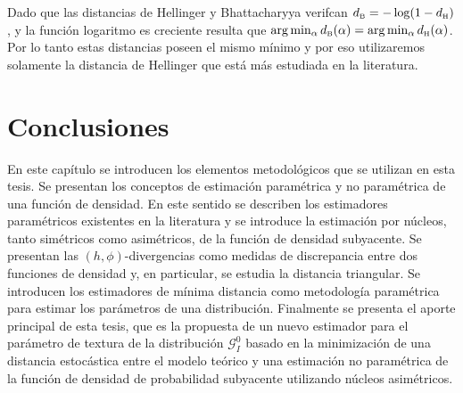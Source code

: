 Dado que las distancias de Hellinger y Bhattacharyya verifcan $d_\text{\tiny B}=-\log(1-d_\text{\tiny H})$, y la función logaritmo es creciente resulta que $\arg\min_\alpha d_\text{\tiny B}(\alpha )=\arg\min_ \alpha d_\text{\tiny H}(\alpha )$. Por lo tanto estas distancias poseen el mismo mínimo y por eso utilizaremos solamente la distancia de Hellinger que está más estudiada en la literatura.

\section{Conclusiones}

En este capítulo se introducen los elementos metodológicos que se utilizan en esta tesis. Se presentan los conceptos de estimación paramétrica y no paramétrica de una función de densidad. En este sentido se describen los estimadores  paramétricos existentes en la literatura y se introduce la estimación por núcleos, tanto simétricos como asimétricos, de la función de densidad subyacente.  Se  presentan las $(h,\phi)$-divergencias como medidas de discrepancia entre dos funciones de densidad y, en particular, se estudia la distancia triangular. Se introducen los estimadores de mínima distancia como metodología paramétrica para estimar los parámetros de una distribución. Finalmente se presenta el aporte principal de esta tesis, que es la propuesta de un nuevo estimador para el parámetro de textura de la distribución $\mathcal{G}_I^0$ basado en la minimización de una distancia estocástica entre el modelo teórico y una estimación no paramétrica de la función de densidad de probabilidad subyacente utilizando núcleos asimétricos.